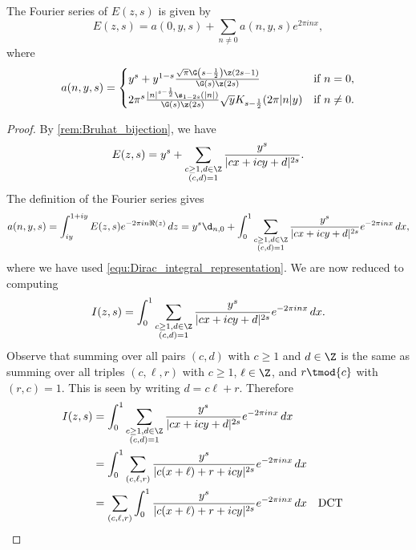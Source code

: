       \begin{proposition}\label{prop:Fourier_coefficients_of_real-analytic_Eisenstein_series}
        The Fourier series of $E(z,s)$ is given by
        \[
          E(z,s) = a(0,y,s)+\sum_{n \neq 0}a(n,y,s)e^{2\pi inx},
        \]
        where
        \[
          a(n,y,s) = \begin{cases} y^{s}+y^{1-s}\frac{\sqrt{\pi}\G\left(s-\frac{1}{2}\right)\z(2s-1)}{\G(s)\z(2s)} & \text{if $n = 0$}, \\ 2\pi^{s}\frac{|n|^{s-\frac{1}{2}}\s_{1-2s}(|n|)}{\G(s)\z(2s)}\sqrt{y}K_{s-\frac{1}{2}}(2\pi|n|y) & \text{if $n \neq 0$}. \end{cases}
        \]
      \end{proposition}
      \begin{proof}
        By \cref{rem:Bruhat_bijection}, we have
        \[
          E(z,s) = y^{s}+\sum_{\substack{c \ge 1, d \in \Z \\ (c,d) = 1}}\frac{y^{s}}{|cx+icy+d|^{2s}}.
        \]
        The definition of the Fourier series gives
        \begin{equation}\label{equ:real-analytic_Eisenstein_fourier_coefficient_definition}
          a(n,y,s) = \int_{iy}^{1+iy}E(z,s)e^{-2\pi in\Re(z)}\,dz = y^{s}\d_{n,0}+\int_{0}^{1}\sum_{\substack{c \ge 1, d \in \Z \\ (c,d) = 1}}\frac{y^{s}}{|cx+icy+d|^{2s}}e^{-2\pi inx}\,dx,
        \end{equation}
        where we have used \cref{equ:Dirac_integral_representation}. We are now reduced to computing
        \[
          I(z,s) = \int_{0}^{1}\sum_{\substack{c \ge 1, d \in \Z \\ (c,d) = 1}}\frac{y^{s}}{|cx+icy+d|^{2s}}e^{-2\pi inx}\,dx.
        \]
        Observe that summing over all pairs $(c,d)$ with $c \ge 1$ and $d \in \Z$ is the same as summing over all triples $(c,\ell,r)$ with $c \ge 1$, $\ell \in \Z$, and $r \tmod{c}$ with $(r,c) = 1$. This is seen by writing $d = c\ell+r$. Therefore
        \begin{align*}
          I(z,s) &= \int_{0}^{1}\sum_{\substack{c \ge 1, d \in \Z \\ (c,d) = 1}}\frac{y^{s}}{|cx+icy+d|^{2s}}e^{-2\pi inx}\,dx \\
          &= \int_{0}^{1}\sum_{(c,\ell,r)}\frac{y^{s}}{|c(x+\ell)+r+icy|^{2s}}e^{-2\pi inx}\,dx \\
          &= \sum_{(c,\ell,r)}\int_{0}^{1}\frac{y^{s}}{|c(x+\ell)+r+icy|^{2s}}e^{-2\pi inx}\,dx &&\text{DCT} \\

\end{align*}
\end{proof}
